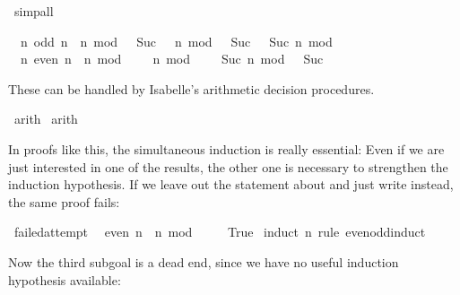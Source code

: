 \begin{isabellebody}
\begin{isamarkuptxt}
\end{isamarkuptxt}%
\isamarkuptrue%
\isamarkupfalse%
\ simp{\isacharunderscore}all%
\begin{isamarkuptxt}%
\begin{isabelle}%
\ {}{\isachardot}\ {\isasymAnd}n{\isachardot}\ odd\ n\ {\isacharequal}\ {\isacharparenleft}n\ mod\ {}\ {\isacharequal}\ Suc\ {}{\isacharparenright}\ {\isasymLongrightarrow}\ {\isacharparenleft}n\ mod\ {}\ {\isacharequal}\ Suc\ {}{\isacharparenright}\ {\isacharequal}\ {\isacharparenleft}Suc\ n\ mod\ {}\ {\isacharequal}\ {}{\isacharparenright}\isanewline
\ {}{\isachardot}\ {\isasymAnd}n{\isachardot}\ even\ n\ {\isacharequal}\ {\isacharparenleft}n\ mod\ {}\ {\isacharequal}\ {}{\isacharparenright}\ {\isasymLongrightarrow}\ {\isacharparenleft}n\ mod\ {}\ {\isacharequal}\ {}{\isacharparenright}\ {\isacharequal}\ {\isacharparenleft}Suc\ n\ mod\ {}\ {\isacharequal}\ Suc\ {}{\isacharparenright}%
\end{isabelle} 

  \noindent These can be handled by Isabelle's arithmetic decision procedures.%
\end{isamarkuptxt}%
\isamarkuptrue%
\isamarkupfalse%
\ arith\isanewline
{}\isamarkupfalse%
\ arith\isanewline
{}\isamarkupfalse%
%
\endisatagproof
{\isafoldproof}%
%
\isadelimproof
%
\endisadelimproof
%
\begin{isamarkuptext}%
In proofs like this, the simultaneous induction is really essential:
  Even if we are just interested in one of the results, the other
  one is necessary to strengthen the induction hypothesis. If we leave
  out the statement about  and just write  instead,
  the same proof fails:%
\end{isamarkuptext}%
\isamarkuptrue%
\isamarkupfalse%
\ failed{\isacharunderscore}attempt{\isacharcolon}\isanewline
\ \ {\isachardoublequoteopen}even\ n\ {\isacharequal}\ {\isacharparenleft}n\ mod\ {}\ {\isacharequal}\ {}{\isacharparenright}{\isachardoublequoteclose}\isanewline
\ \ {\isachardoublequoteopen}True{\isachardoublequoteclose}\isanewline
%
\isadelimproof
%
\endisadelimproof
%
\isatagproof
{}\isamarkupfalse%
\ {\isacharparenleft}induct\ n\ rule{\isacharcolon}\ even{\isacharunderscore}odd{\isachardot}induct{\isacharparenright}%
\begin{isamarkuptxt}%
\noindent Now the third subgoal is a dead end, since we have no
  useful induction hypothesis available:


\end{isamarkuptxt}
\end{isabellebody}
